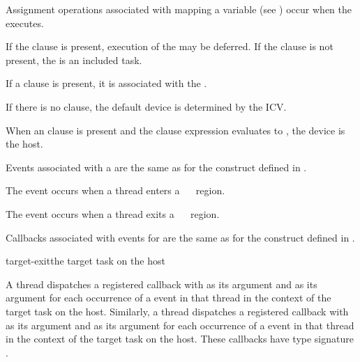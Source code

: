 Assignment operations associated with mapping a variable (see 
) occur when the  executes.

If the  clause is present, execution of the  may be 
deferred.  If the  clause is not present, the  is an 
included task.

If a  clause is present, it is associated with the .

If there is no  clause, the default device is determined by the 
 ICV.

When an  clause is present and the  clause expression evaluates 
to , the device is the host.

\events

Events associated with a  are the same as for the  
construct defined in .

The  event occurs when a thread enters a
~~ region.

The  event occurs when a thread exits a
~~ region.

\tools

Callbacks associated with events for  are the same as
for the  construct defined in .

{target-exit}{the target task on the host}

A thread dispatches a registered  callback with
 as its  argument and
 as its  argument for each occurrence
of a  event in that thread in the context of the
target task on the host. Similarly, a thread dispatches a registered
 callback with  as its
 argument and  as its 
argument for each occurrence of a  event in that thread
in the context of the target task on the host. These callbacks have
type signature . 

